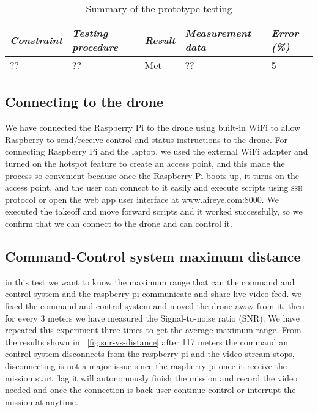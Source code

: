 \documentclass[../main.tex]{subfiles}
\begin{document}
\begin{table}[H]
    \centering
    \caption{Summary of the prototype testing}
    \label{tab:testing-summary}
    \begin{tabularx}{\textwidth}{ l X l l l }
        \toprule
        \textit{Constraint} 
            & \textit{Testing procedure} 
                & \textit{Result}
        & \textit{Measurement data} 
            & \textit{Error (\%)} \\

        \midrule
        
        
        ??    & ?? 
        & Met
            & ??
        & 5 \\

        \bottomrule		
    \end{tabularx}
\end{table}


\subsection{Connecting to the drone}

We have connected the
Raspberry Pi to the drone using built-in WiFi
to allow Raspberry to send/receive control and status 
instructions to the drone. 
For connecting Raspberry Pi and the laptop, 
we used the external WiFi adapter and turned 
on the hotspot feature to create an access point,
and this made the process so convenient because 
once the Raspberry Pi boots up, it turns on the 
access point, and the user can connect to it 
easily and execute scripts using \textsc{ssh} 
protocol or open the web app user interface 
at www.aireye.com:8000. We executed the takeoff 
and move forward scripts and it worked successfully, so
we confirm that we can connect to the drone and can control it.

\subsection{Command-Control system maximum distance}

in this test we want to know the maximum range that can
the command and control system and the raspberry pi communicate
and share live video feed. we fixed the command and control system and moved
the drone away from it, then for every 3 meters we have measured the Signal-to-noise ratio (SNR).
We have repeated this experiment three times to get the average maximum range.
From the results shown in ~\ref{fig:snr-vs-distance} after 117 meters 
the command an control system disconnects from the raspberry pi
and the video stream stops, disconnecting is not a major issue
since the raspberry pi once it receive the mission start
flag it will autonomously finish the mission and record the video needed
and once the connection is back user continue control or interrupt the mission
at anytime.
 
\end{document}
